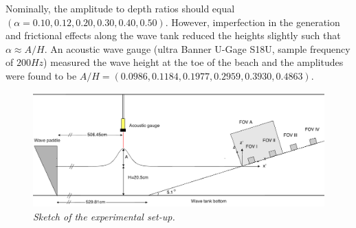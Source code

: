 \documentclass[review, authoryear]{elsarticle}
\begin{document}
Nominally, the amplitude to depth ratios should equal $(\alpha=0.10,0.12,0.20,0.30,0.40,0.50)$.  
However, imperfection in the generation and frictional effects along
the wave tank reduced the heights slightly such that $\alpha \approx A/H$.  
An acoustic wave gauge (ultra Banner U-Gage S18U, sample frequency of $200Hz$) measured the wave height at the toe of the beach and the amplitudes were found to
 be $A/H=(0.0986, 0.1184, 0.1977, 0.2959, 0.3930, 0.4863)$.

\begin{figure}[]
\centering
\includegraphics[width=\textwidth]{./Figures/setup3.png}
\caption{\textit{ Sketch of  the experimental set-up.}}
\label{fig:beach_tegning}
\end{figure}
\end{document}
